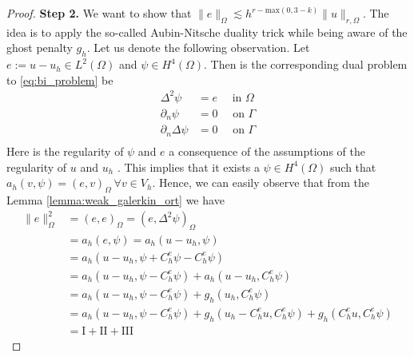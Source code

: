 \documentclass[11pt]{article}
\theoremstyle{remark}
\numberwithin{equation}{section}
\begin{document}
\begin{proof}
        \textbf{Step 2.}
        We want to show that $ \| e \|_{ \Omega  }^{  } \lesssim   h^{r- \mathrm{max}(0,3-k)} \| u \|_{ r ,\Omega  }^{  }$. The idea is to apply the so-called Aubin-Nitsche duality trick while being aware of the ghost penalty $g_{h}$. Let us denote the following
        observation.
        Let $e:= u -u_{h} \in L^{2}( \Omega ) $ and $\psi  \in H^{4}( \Omega ) $.
        Then is the corresponding dual problem to \eqref{eq:bi_problem} be
        \begin{equation}
            \begin{split}
            \Delta ^2 \psi &= e  \quad  \text{ in } \Omega  \\
            \partial _{n} \psi &= 0 \quad \text{ on } \Gamma \\
            \partial _{n} \Delta \psi & = 0 \quad  \text{ on } \Gamma   \\
            \end{split}
        \end{equation}
 Here is the regularity of $\psi $ and $e$ a consequence of the assumptions of the regularity of $u$ and $u_{h}$  \cite[pp. 113]{brenner2012}.
        This implies that it exists a $\psi \in H^{4}( \Omega ) $ such that $a_{h}(v, \psi ) = ( e,v)_{\Omega } \ \forall v \in V_{h}  $. Hence, we can easily observe that from the Lemma \ref{lemma:weak_galerkin_ort} we have
        \begin{equation}
            \label{eq:ni_1}
            \begin{split}
        \| e \|_{ \Omega  }^{ 2 }  & = ( e,e)_\Omega   = ( e, \Delta ^2 \psi )_{\Omega } \\
        &= a_{h}( e, \psi  ) = a_{h}( u-u_h, \psi ) \\
        &= a_{h}( u-u_h, \psi + C^{e}_{h}\psi  - C^{e}_{h}\psi )  \\
        &= a_{h}( u-u_h, \psi   - C^{e}_{h}\psi ) +  a_{h}( u-u_h, C^{e}_{h}\psi )  \\
        &= a_{h}( u-u_h, \psi  - C^{e}_{h}\psi ) +  g_{h}( u_h, C^{e}_{h}\psi ) \\
        &= a_{h}( u-u_h, \psi  - C^{e}_{h}\psi ) +  g_{h}( u_h - C^{e}_{h}u, C^{e}_{h}\psi )+  g_{h}( C^{e}_{h}u, C^{e}_{h}\psi ) \\
        &  = \mathrm{I} + \mathrm{II} + \mathrm{III}
            \end{split}
        \end{equation}


\end{proof}
\end{document}
